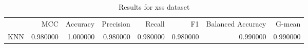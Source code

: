 \begin{table}
\caption{Results for xss dataset}
\begin{tabular}{lrrrrrrr}
 & MCC & Accuracy & Precision & Recall & F1 & Balanced Accuracy & G-mean \\
KNN & 0.980000 & 1.000000 & 0.980000 & 0.980000 & 0.980000 & 0.990000 & 0.990000 \\
\end{tabular}
\end{table}
